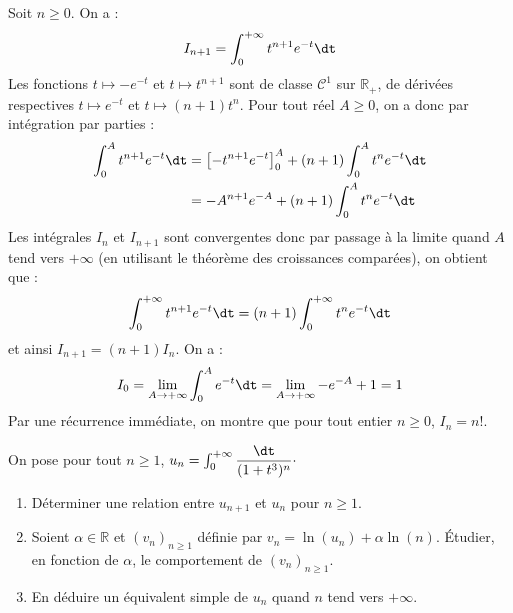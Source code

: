 \documentclass[a4paper,10pt]{report}
\begin{document}
\medskip

\noindent Soit $n \geq 0$. On a :
$$ I_{n+1} = \int_0^{+ \infty} t^{n+1} e^{-t} \dt$$
Les fonctions $t \mapsto -e^{-t}$ et $t \mapsto t^{n+1}$ sont de classe $\mathcal{C}^1$ sur $\mathbb{R}_+$, de dérivées respectives $t \mapsto e^{-t}$ et $t \mapsto (n+1)t^n$. Pour tout réel $A \geq 0$, on a donc par intégration par parties :
\begin{align*}
\int_0^A t^{n+1} e^{-t} \dt & = \left[- t^{n+1} e^{-t} \right]_0^A +  (n+1) \int_0^A t^{n} e^{-t} \dt \\
& = -A^{n+1} e^{-A} +  (n+1) \int_0^A t^{n} e^{-t} \dt
\end{align*}
Les intégrales $I_n$ et $I_{n+1}$ sont convergentes donc par passage à la limite quand $A$ tend vers $+ \infty$ (en utilisant le théorème des croissances comparées), on obtient que :
$$ \int_0^{+ \infty} t^{n+1} e^{-t} \dt = (n+1)\int_0^{+ \infty} t^{n} e^{-t} \dt$$
et ainsi $I_{n+1}=(n+1) I_n$. On a :
$$ I_0 = \lim_{A \rightarrow + \infty} \int_0^A e^{-t} \dt = \lim_{A \rightarrow + \infty} -e^{-A}+1 = 1$$
Par une récurrence immédiate, on montre que pour tout entier $n \geq 0$, $I_n=n!$.

\begin{Exa} On pose pour tout $n \geq 1$, $u_n = \int_{0}^{+ \infty} \dfrac{\dt}{(1+t^3)^n} \cdot$
\begin{enumerate}
\item Déterminer une relation entre $u_{n+1}$ et $u_n$ pour $n \geq 1$.
\item Soient $\alpha \in \mathbb{R}$ et $(v_n)_{n \geq 1}$ définie par $v_n = \ln(u_n) + \alpha \ln(n)$. Étudier, en fonction de $\alpha$, le comportement de $(v_n)_{n \geq 1}$.
\item En déduire un équivalent simple de $u_n$ quand $n$ tend vers $+ \infty$.
\end{enumerate}
\end{Exa} 
\end{document}
